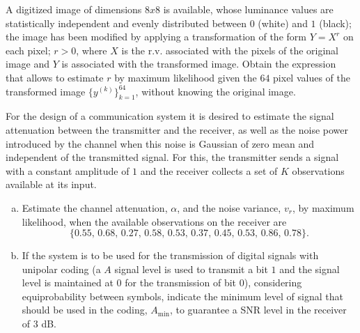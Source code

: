 \begin{prob}
\label{ProbEstImagen}

A digitized image of dimensions $8x8$ is available, whose luminance values are statistically independent and evenly distributed between $0$ (white) and $1$ (black); the image has been modified by applying a transformation of the form $Y = X^r$ on each pixel; $r>0$, where $X$ is the r.v. associated with the pixels of the original image and $Y$ is associated with the transformed image. Obtain the expression that allows to estimate $r$ by maximum likelihood given the $64$ pixel values of the transformed image $\{y^{(k)}\}_{k=1}^{64}$, without knowing the original image.

\end{prob}


\begin{prob}
\label{ProbEstCanal}

For the design of a communication system it is desired to estimate the signal attenuation between the transmitter and the receiver, as well as the noise power introduced by the channel when this noise is Gaussian of zero mean and independent of the transmitted signal. For this, the transmitter sends a signal with a constant amplitude of $1$ and the receiver collects a set of $K$ observations available at its input.

\begin{enumerate}[a)]
\item Estimate the channel attenuation, $\alpha$, and the noise variance, $v_r$, by maximum likelihood, when the available observations on the receiver are
$$
\{0.55,\, 0.68,\, 0.27,\, 0.58,\, 0.53,\, 0.37,\, 0.45,\, 0.53,\, 0.86,\, 0.78 \}. 
$$
\item If the system is to be used for the transmission of digital signals with unipolar coding (a $A$ signal level is used to transmit a bit $1$ and the signal level is maintained at $0$ for the transmission of bit $0$), considering equiprobability between symbols, indicate the minimum level of signal that should be used in the coding, $A_{\min}$, to guarantee a SNR level in the receiver of $3$ dB.
\end{enumerate}

\end{prob}

